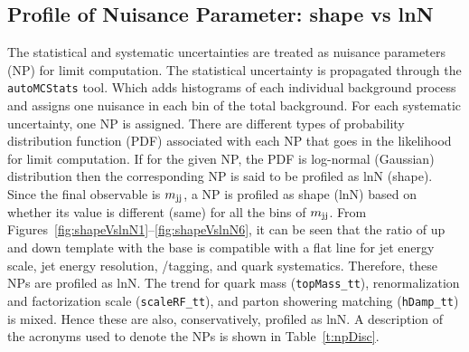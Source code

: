 \subsection{Profile of Nuisance Parameter: shape vs lnN}
\label{a:secShapeVslnN}
The statistical and systematic uncertainties are treated as nuisance parameters (NP) for
limit computation. The statistical uncertainty is propagated through the \verb|autoMCStats| tool.
Which adds histograms of each individual background process and assigns one nuisance in each bin of
the total background. For each systematic uncertainty, one NP is assigned. There are different types
of probability distribution function (PDF) associated with each NP that goes in the likelihood for
limit computation. If for the given NP, the PDF is log-normal (Gaussian) distribution then the
corresponding NP is said to be profiled as lnN (shape). Since the final observable is $m_\text{jj}$,
a NP is profiled as shape (lnN) based on whether its value is different (same) for all
the bins of $m_\text{jj}$. From Figures~\ref{fig:shapeVslnN1}--\ref{fig:shapeVslnN6}, it can be seen that
the ratio of up and down template with the base is compatible with a flat line for jet energy scale,
jet energy resolution, \PQb/\PQc tagging, and \PQt quark \pt systematics. Therefore, these NPs are
profiled as lnN. The trend for \PQt quark mass (\verb|topMass_tt|), renormalization and factorization
scale (\verb|scaleRF_tt|), and parton showering matching (\verb|hDamp_tt|) is mixed. Hence these are
also, conservatively, profiled as lnN. A description of the acronyms used to denote the NPs is shown
in Table~\ref{t:npDisc}.
